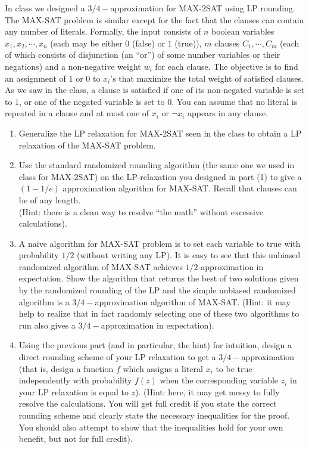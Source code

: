 \newpage
\pb
In class we designed a $3/4-$approximation for MAX-$2$SAT using LP rounding. The MAX-SAT problem is similar except for the fact that the clauses can contain any number of literals. Formally, the input consists of $n$ boolean variables $x_{1},x_{2},\cdots,x_{n}$ (each may be either $0$ (false) or $1$ (true)), $m$ clauses $C_{1},\cdots,C_{m}$ (each of which consists of disjunction (an “or”) of some number variables or their negations) and a non-negative weight $w_{i}$ for each clause. The objective is to find an assignment of $1$ or $0$ to $x_{i}$'s that maximize the total weight of satisfied clauses. As we saw in the class, a clause is satisfied if one of its non-negated variable is set to $1$, or one of the negated variable is set to $0$. You can assume that no literal is repeated in a clause and at most
one of $x_{i}$ or $\neg x_{i}$ appears in any clause.
\begin{enumerate}[label=(\alph*)]
\item Generalize the LP relaxation for MAX-$2$SAT seen in the class to obtain a LP relaxation of the MAX-SAT problem.
\item Use the standard randomized rounding algorithm (the same one we used in class for MAX-2SAT) on the LP-relaxation you designed in part (1) to give a $(1-1/e)$ approximation algorithm for MAX-SAT. Recall that clauses can be of any length.\\
(Hint: there is a clean way to resolve ``the math'' without excessive calculations).
\item A naive algorithm for MAX-SAT problem is to set each variable to true with probability $1/2$ (without writing any LP). It is easy to see that this unbiased randomized algorithm of MAX-SAT achieves $1/2$-approximation in expectation. Show the algorithm that returns the best of two solutions given by the randomized rounding of the LP and the simple unbiased randomized algorithm is a $3/4-$approximation algorithm of MAX-SAT. (Hint: it may help to realize that in fact randomly selecting one of these two algorithms to run also gives a $3/4-$approximation in expectation).
\item Using the previous part (and in particular, the hint) for intuition, design a direct rounding scheme of your LP relaxation to get a $3/4-$approximation (that is, design a function $f$ which assigns a literal $x_{i}$ to be true independently with probability $f(z)$ when the corresponding variable $z_{i}$ in your LP relaxation is equal to $z$). (Hint: here, it may get messy to fully resolve the calculations. You will get full credit if you state the correct rounding scheme and clearly state the necessary inequalities for the proof. You should also attempt to show that the inequalities hold for your own benefit, but not for full credit).
\end{enumerate}

